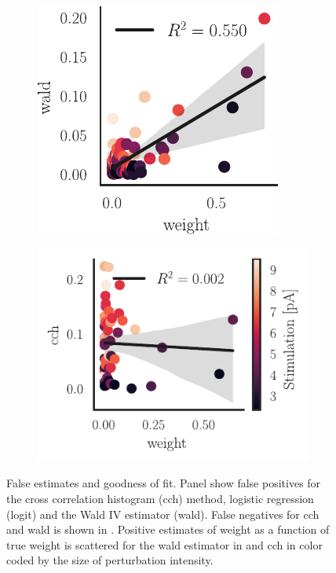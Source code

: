 \documentclass[11pt]{article}
\begin{document}
\begin{figure}
\medskip
\begin{subfigure}{0.46\textwidth} \includegraphics[scale=1]{fit_wald_pos}
\caption{} \label{fig:network-class:3}
\end{subfigure}\hfill
\begin{subfigure}{0.6\textwidth} \includegraphics[scale=1]{fit_cch_pos}
\caption{} \label{fig:network-class:4}
\end{subfigure}
\caption{False estimates and goodness of fit. Panel  show false positives for the cross correlation histogram (cch) method, logistic regression (logit) and the Wald IV estimator (wald). False negatives for cch and wald is shown in . Positive estimates of weight as a function of true weight is scattered for the wald estimator in  and cch in  color coded by the size of perturbation intensity. \label{fig:network-class}}
\end{figure}
\end{document}
